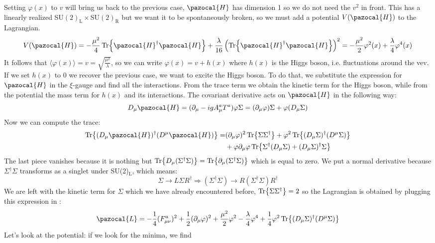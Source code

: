 \documentclass[../main.tex]{subfiles}
\begin{document}
Setting $\varphi(x)$ to $v$ will bring us back to the previous case, $\pazocal{H}$ has dimension 1 so we do not need the $v^2$ in front. This has a linearly realized SU$(2)_{\text{L}}\times$SU$(2)_{\text{R}}$ but we want it to be spontaneously broken, so we must add a potential $V(\pazocal{H})$ to the Lagrangian.
\[
V(\pazocal{H})=-\frac{\mu^2}{4}\Tr{\pazocal{H}^\dagger\pazocal{H}}+\frac{\lambda}{16}\left(\Tr{\pazocal{H}^\dagger\pazocal{H}}\right)^2=-\frac{\mu^2}{2}\varphi^2(x)+\frac{\lambda}{4}\varphi^4(x)
\]
It follows that $\langle\varphi(x)\rangle=v=\sqrt{\frac{\mu^2}{\lambda}}$, so we can write $\varphi(x)=v+h(x)$ where $h(x)$ is the Higgs boson, i.e. fluctuations around the vev. If we set $h(x)$ to 0 we recover the previous case, we want to excite the Higgs boson. To do that, we substitute the expression for $\pazocal{H}$ in the $\xi$-gauge and find all the interactions. From the trace term we obtain the kinetic term for the Higgs boson, while from the potential the mass term for $h(x)$ and its interactions. The covariant derivative acts on $\pazocal{H}$ in the following way:
\[
D_\mu\pazocal{H}=(\partial_\mu-igA_\mu^aT^a)\varphi\Sigma=(\partial_\mu\varphi)\Sigma+\varphi(D_\mu\Sigma)
\]
Now we can compute the trace:
\begin{align*}
\Tr{(D_\mu\pazocal{H})^\dagger(D^\mu\pazocal{H})}=&(\partial_\mu\varphi)^2\Tr{\Sigma\Sigma^\dagger}+\varphi^2\Tr{(D_\mu\Sigma)^\dagger(D^\mu\Sigma)}\\
&+\varphi\partial_\mu\varphi\Tr{\Sigma^\dagger(D_\mu\Sigma)+(D_\mu\Sigma)^\dagger\Sigma}
\end{align*}
The last piece vanishes because it is nothing but $\Tr{D_\mu(\Sigma^\dagger\Sigma)}=\Tr{\partial_\mu(\Sigma^\dagger\Sigma)}$ which is equal to zero. We put a normal derivative because $\Sigma^\dagger\Sigma$ transforms as a singlet under SU(2)$_{\text{L}}$, which means:
\[
\Sigma\to L\Sigma R^\dagger\Rightarrow(\Sigma^\dagger\Sigma)\to R(\Sigma^\dagger\Sigma)R^\dagger
\]
We are left with the kinetic term for $\Sigma$ which we have already encountered before, $\Tr{\Sigma\Sigma^\dagger}=2$ so the Lagrangian is obtained by plugging this expression in :
\[
\pazocal{L}=-\frac{1}{4}(F_{\mu\nu}^a)^2+\frac{1}{2}(\partial_\mu\varphi)^2+\frac{\mu^2}{2}\varphi^2-\frac{\lambda}{4}\varphi^4+\frac{1}{4}\varphi^2\Tr{(D_\mu\Sigma)^\dagger(D^\mu\Sigma)}
\]
Let's look at the potential: if we look for the minima, we find\\
\end{document}

